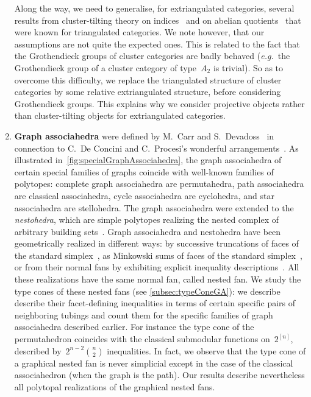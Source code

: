 \documentclass{amsart}
\theoremstyle{definition}
\newcommand{\eg}{\textit{e.g.}~} %
\newcommand{\darkblue}{\color{darkblue}} %
\newcommand{\defn}[1]{\textsl{\darkblue #1}} %
\begin{document}
\begin{enumerate}[$\quad\bullet$]
Along the way, we need to generalise, for extriangulated categories, several results from cluster-tilting theory on indices~\cite{DehyKeller} and on abelian quotients~\cite{BuanMarshReiten, KellerReiten} that were known for triangulated categories.
We note however, that our assumptions are not quite the expected ones.
This is related to the fact that the Grothendieck groups of cluster categories are badly behaved (\eg the Grothendieck group of a cluster category of type~$A_2$ is trivial).
So as to overcome this difficulty, we replace the triangulated structure of cluster categories by some relative extriangulated structure, before considering Grothendieck groups.
This explains why we consider projective objects rather than cluster-tilting objects for extriangulated categories.

\medskip
\item \textbf{Graph associahedra} were defined by M.~Carr and S.~Devadoss~\cite{CarrDevadoss} in connection to C.~De Concini and C.~Procesi's wonderful arrangements~\cite{DeConciniProcesi}. As illustrated in~\cref{fig:specialGraphAssociahedra}, the graph associahedra of certain special families of graphs coincide with well-known families of polytopes: complete graph associahedra are permutahedra, path associahedra are classical associahedra, cycle associahedra are cyclohedra, and star associahedra are stellohedra. The graph associahedra were extended to the \defn{nestohedra}, which are simple polytopes realizing the nested complex of arbitrary building sets~\cite{Postnikov, FeichtnerSturmfels}. Graph associahedra and nestohedra have been geometrically realized in different ways: by successive truncations of faces of the standard simplex~\cite{CarrDevadoss}, as Minkowski sums of faces of the standard simplex~\cite{Postnikov, FeichtnerSturmfels}, or from their normal fans by exhibiting explicit inequality descriptions~\cite{Devadoss, Zelevinsky}. All these realizations have the same normal fan, called nested fan. We study the type cones of these nested fans (see \cref{subsec:typeConeGA}): we describe describe their facet-defining inequalities in terms of certain specific pairs of neighboring tubings and count them for the specific families of graph associahedra described earlier. For instance the type cone of the permutahedron coincides with the classical submodular functions on~$2^{[n]}$, described by~$2^{n-2} \binom{n}{2}$ inequalities. In fact, we observe that the type cone of a graphical nested fan is never simplicial except in the case of the classical associahedron (when the graph is the path). Our results describe nevertheless all polytopal realizations of the graphical nested fans.
\end{enumerate}
\end{document}
